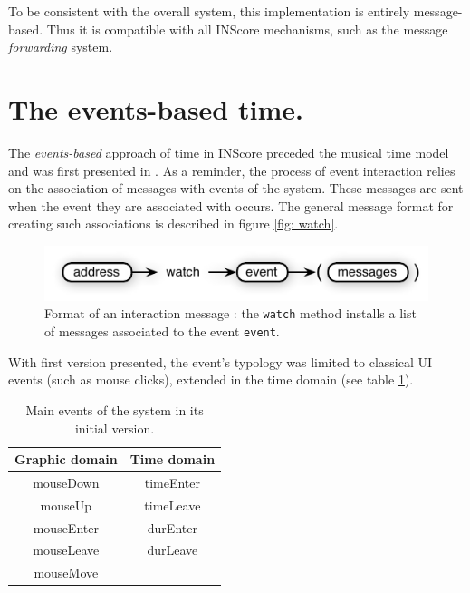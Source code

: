 \documentclass{article}
\newcommand{\OSC}[1]	{{\fontsize{9pt}{9pt} \selectfont\texttt{#1}}}
\begin{document}
To be consistent with the overall system, this implementation is entirely message-based. Thus it is compatible with all INScore mechanisms, such as the message \emph{forwarding} system.

\section{The events-based time.}\label{evtime}

The \emph{events-based} approach of time in INScore preceded the musical time model and was first presented in \cite{fober13a}. As a reminder, the process of event interaction relies on the association of messages with events of the system. These messages are sent when the event they are associated with occurs. The general message format for creating such associations is described in figure \ref{fig: watch}.

\begin{figure}[htbp]
\centerline{
	\includegraphics[width=0.95\columnwidth]{imgs/watch}}
\caption{Format of an interaction message : the \OSC{watch} method installs a list of messages associated to the event\OSC{event}.}
\label{fig:watch}
\end{figure}

With first version presented, the event's typology was limited to classical UI events (such as mouse clicks), extended in the time domain (see table \ref{tbl:evts}). 

\begin{table}[htp]
\begin{center}
\begin{tabular}{c|c}
Graphic domain & Time domain \\
\hline
mouseDown 		& timeEnter	\\
mouseUp			& timeLeave	\\
mouseEnter		& durEnter		\\
mouseLeave		& durLeave		\\
mouseMove		&				\\
\end{tabular}
\end{center}
\caption{Main events of the system in its initial version.}
\label{tbl:evts}
\end{table}%
\end{document}

